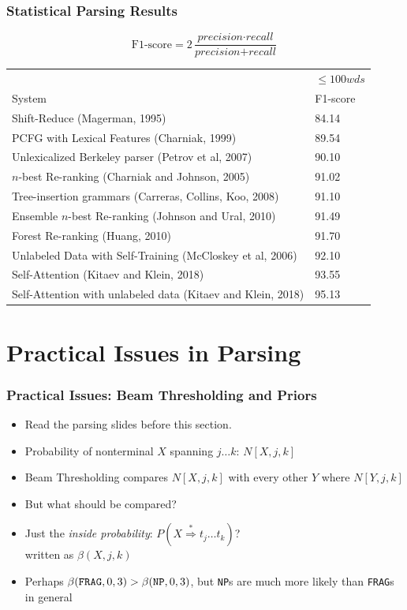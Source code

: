 \begin{frame}
\frametitle{Statistical Parsing Results}
\begin{center}
\footnotesize
\[ \textrm{F1-score} = 2 \frac{\textit{precision} \cdot \textit{recall}}{\textit{precision} + \textit{recall}} \]
\begin{tabular}{|p{7cm}|l|}
\hline
  & $\leq 100 wds$  \\
System & F1-score \\
\hline
Shift-Reduce (Magerman, 1995)   & 84.14 \\
PCFG with Lexical Features (Charniak, 1999)   & 89.54 \\
Unlexicalized Berkeley parser (Petrov et al, 2007) & 90.10 \\
$n$-best Re-ranking (Charniak and Johnson, 2005) & 91.02 \\
Tree-insertion grammars (Carreras, Collins, Koo, 2008) & 91.10 \\
Ensemble $n$-best Re-ranking (Johnson and Ural, 2010) & 91.49 \\
Forest Re-ranking (Huang, 2010) & 91.70 \\
Unlabeled Data with Self-Training (McCloskey et al, 2006) & 92.10 \\
\hline
Self-Attention (Kitaev and Klein, 2018) & 93.55 \\
Self-Attention with unlabeled data (Kitaev and Klein, 2018) & 95.13 \\
\hline
\end{tabular}
\end{center}
\end{frame}

\section{Practical Issues in Parsing}


\begin{frame}
\frametitle{Practical Issues: Beam Thresholding and Priors}
\begin{itemize}
\item Read the parsing slides before this section.
\item Probability of nonterminal $X$ spanning $j \ldots k$:
$N[X,j,k]$
\item Beam Thresholding compares $N[X,j,k]$ with every other $Y$
where $N[Y,j,k]$
\item But what should be compared?
\item Just the {\em inside probability}: $P(X \stackrel{*}{\Rightarrow} t_j
\ldots t_k)$?\\
written as $\beta(X, j, k)$
\item Perhaps $\beta(\mbox{\tt FRAG}, 0, 3) > \beta(\mbox{\tt NP}, 0,
3)$, but {\tt NP}s are much more likely than {\tt FRAG}s in general
\end{itemize}
\end{frame}

